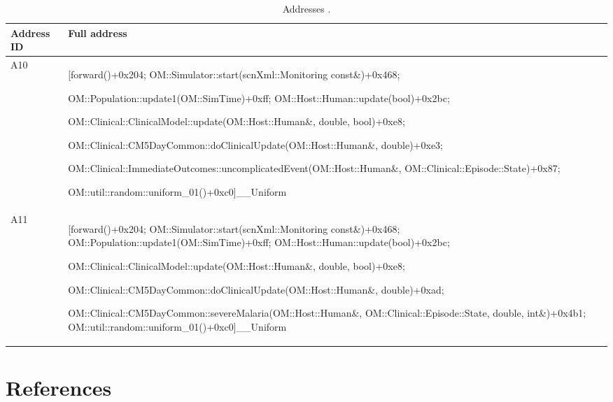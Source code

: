 \documentclass{article}
\begin{document}
  \begin{table}[ht!]
  \footnotesize
  \setlength{\tabcolsep}{1mm}
  \caption{Addresses .}
  \label{table:addresses}
  \def\arraystretch{1.25}
  \begin{tabularx}{\textwidth}{@{}lX@{}} 
    \toprule
    Address ID & Full address \\
    \midrule
A10 & [forward()+0x204; OM::Simulator::start(scnXml::Monitoring const\&)+0x468;

OM::Population::update1(OM::SimTime)+0xff; OM::Host::Human::update(bool)+0x2bc;

OM::Clinical::ClinicalModel::update(OM::Host::Human\&, double, bool)+0xe8;

OM::Clinical::CM5DayCommon::doClinicalUpdate(OM::Host::Human\&, double)+0xe3;

OM::Clinical::ImmediateOutcomes::uncomplicatedEvent(OM::Host::Human\&, OM::Clinical::Episode::State)+0x87;

OM::util::random::uniform\_01()+0xc0]\_\_Uniform\\
A11 & [forward()+0x204; OM::Simulator::start(scnXml::Monitoring const\&)+0x468;
OM::Population::update1(OM::SimTime)+0xff; OM::Host::Human::update(bool)+0x2bc;

OM::Clinical::ClinicalModel::update(OM::Host::Human\&, double, bool)+0xe8;

OM::Clinical::CM5DayCommon::doClinicalUpdate(OM::Host::Human\&, double)+0xad;

OM::Clinical::CM5DayCommon::severeMalaria(OM::Host::Human\&, OM::Clinical::Episode::State, double, int\&)+0x4b1;
OM::util::random::uniform\_01()+0xc0]\_\_Uniform\\
    \bottomrule
  \end{tabularx}
  \end{table}
\section*{References}



\end{document}
